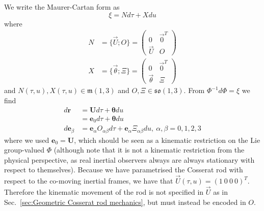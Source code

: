 We write the Maurer-Cartan form as
\begin{equation}
\xi = N d \tau + X du
\end{equation}
where
\begin{subequations}
\begin{align}
N & = \{ \vec{U} ; O \} = \begin{pmatrix}
0 & \vec{0}^T \\
\vec{U} & O
\end{pmatrix} \\
X & = \{ \vec{\theta} ; \Xi \} = \begin{pmatrix}
0 & \vec{0}^T \\
\vec{\theta} & \Xi
\end{pmatrix} 
\end{align}
\end{subequations}
and $N(\tau, u), X(\tau, u) \in \mathfrak{m}(1,3)$ and $O, \Xi \in \mathfrak{so}(1,3)$. From $\Phi^{-1} d \Phi = \xi$ we find
\begin{subequations}
\begin{align}
d \mathbf{r} & = \mathbf{U} d \tau + \boldsymbol{\theta} du \\
 & = \mathbf{e}_0 d \tau + \boldsymbol{\theta} du \nonumber \\
d \mathbf{e}_\beta & = \mathbf{e}_\alpha O_{\alpha \beta} d\tau + \mathbf{e}_\alpha \Xi_{\alpha \beta} du,\ \alpha,\beta = 0,1,2,3
\end{align}
\end{subequations}
where we used $\mathbf{e}_0 = \mathbf{U}$, which should be seen as a kinematic restriction on the Lie group-valued $\Phi$ (although note that it is not a kinematic restriction from the physical perspective, as real inertial observers always are always stationary with respect to themselves). Because we have parametrised the Cosserat rod with respect to the co-moving inertial frames, we have that $\vec{U}(\tau, u) = (1\ 0\ 0\ 0)^T$. Therefore the kinematic movement of the rod is not specified in $\vec{U}$ as in Sec.~\ref{sec:Geometric Cosserat rod mechanics}, but must instead be encoded in $O$.

